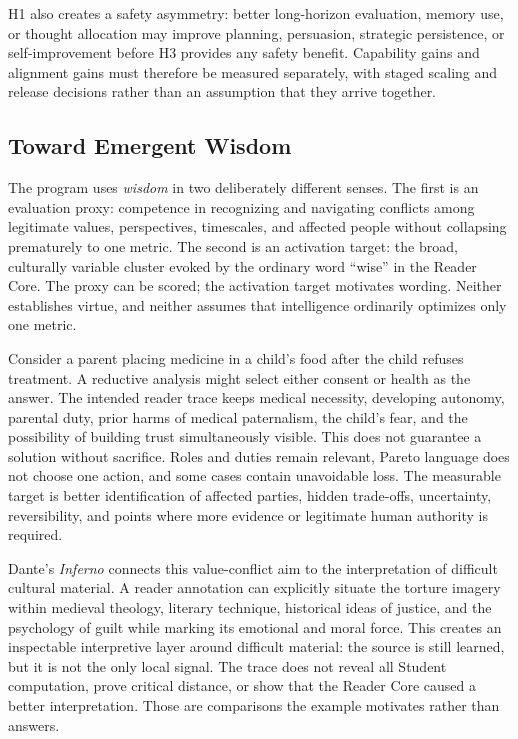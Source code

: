 \documentclass[11pt]{article}
\begin{document}
H1 also creates a safety asymmetry: better long-horizon evaluation, memory use, or thought allocation may improve planning, persuasion, strategic persistence, or self-improvement before H3 provides any safety benefit. Capability gains and alignment gains must therefore be measured separately, with staged scaling and release decisions rather than an assumption that they arrive together.

\subsection{Toward Emergent Wisdom}
\label{sec:wisdom_hypothesis}

The program uses \emph{wisdom} in two deliberately different senses. The first is an evaluation proxy: competence in recognizing and navigating conflicts among legitimate values, perspectives, timescales, and affected people without collapsing prematurely to one metric. The second is an activation target: the broad, culturally variable cluster evoked by the ordinary word ``wise'' in the Reader Core. The proxy can be scored; the activation target motivates wording. Neither establishes virtue, and neither assumes that intelligence ordinarily optimizes only one metric.

Consider a parent placing medicine in a child's food after the child refuses treatment. A reductive analysis might select either consent or health as the answer. The intended reader trace keeps medical necessity, developing autonomy, parental duty, prior harms of medical paternalism, the child's fear, and the possibility of building trust simultaneously visible. This does not guarantee a solution without sacrifice. Roles and duties remain relevant, Pareto language does not choose one action, and some cases contain unavoidable loss. The measurable target is better identification of affected parties, hidden trade-offs, uncertainty, reversibility, and points where more evidence or legitimate human authority is required.

Dante's \emph{Inferno} connects this value-conflict aim to the interpretation of
difficult cultural material. A reader annotation can explicitly situate the torture imagery within medieval theology, literary technique, historical ideas of justice, and the psychology of guilt while marking its emotional and moral force. This creates an inspectable interpretive layer around difficult material: the source is still learned, but it is not the only local signal. The trace does not reveal all Student computation, prove critical distance, or show that the Reader Core caused a better interpretation. Those are comparisons the example motivates rather than answers.
\end{document}
